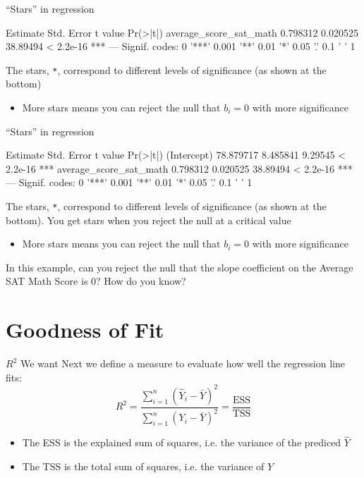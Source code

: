 \documentclass[aspectratio=169,t,11pt,table]{beamer}
\begin{document}
\begin{frame}[fragile]{``Stars'' in regression}
  \vspace*{-\bigskipamount}
  \begin{codeblock}[{}]
                        Estimate Std. Error  t value  Pr(>|t|)
average_score_sat_math  0.798312   0.020525 38.89494 < 2.2e-16 ***
---
Signif. codes:  0 '***' 0.001 '**' 0.01 '*' 0.05 '.' 0.1 ' ' 1
  \end{codeblock}

  \bigskip
  The stars, \texttt{*}, correspond to different levels of significance (as shown at the bottom)
  \begin{itemize}
    \item More stars means you can reject the null that $b_i = 0$ with more significance
  \end{itemize}
\end{frame}

\begin{frame}[fragile]{``Stars'' in regression}
  \vspace*{-\bigskipamount}
  \begin{codeblock}[{}]
                        Estimate Std. Error  t value  Pr(>|t|)
(Intercept)            78.879717   8.485841  9.29545 < 2.2e-16 ***
average_score_sat_math  0.798312   0.020525 38.89494 < 2.2e-16 ***
---
Signif. codes:  0 '***' 0.001 '**' 0.01 '*' 0.05 '.' 0.1 ' ' 1
  \end{codeblock}

  \bigskip
  The stars, \texttt{*}, correspond to different levels of significance (as shown at the bottom). You get stars when you reject the null at a critical value
  \begin{itemize}
    \item More stars means you can reject the null that $b_i = 0$ with more significance
  \end{itemize}

  \bigskip
  In this example, can you reject the null that the slope coefficient on the Average SAT Math Score is 0? How do you know?
\end{frame}



\section{Goodness of Fit}

\begin{frame}{$R^2$}
  We want 
  Next we define a measure to evaluate how well the regression line fits:
  $$
    R^2 = \frac{\sum_{i=1}^n (\hat{Y}_i - \bar{Y})^2}{\sum_{i=1}^n (Y_i - \bar{Y})^2} = \frac{\text{ESS}}{\text{TSS}}
  $$
  \begin{itemize}
    \item The ESS is the \alert{explained sum of squares}, i.e. the variance of the prediced $\hat{Y}$
    \item The TSS is the \alert{total sum of squares}, i.e. the variance of $Y$
  \end{itemize}
\end{frame}
\end{document}
